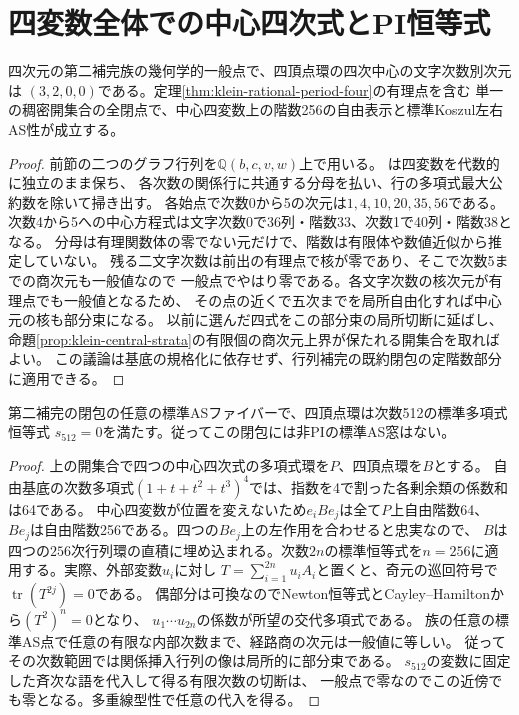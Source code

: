 \section{四変数全体での中心四次式とPI恒等式}
\label{sec:klein-generic-central-parameters}
\begin{theorem}\label{thm:klein-generic-central-parameters}
四次元の第二補完族の幾何学的一般点で、四頂点環の四次中心の文字次数別次元は
$(3,2,0,0)$である。定理\ref{thm:klein-rational-period-four}の有理点を含む
単一の稠密開集合の全閉点で、中心四変数上の階数256の自由表示と標準Koszul左右AS性が成立する。
\end{theorem}
\begin{proof}
前節の二つのグラフ行列を$\mathbb Q(b,c,v,w)$上で用いる。
は四変数を代数的に独立のまま保ち、
各次数の関係行に共通する分母を払い、行の多項式最大公約数を除いて掃き出す。
各始点で次数0から5の次元は$1,4,10,20,35,56$である。
次数4から5への中心方程式は文字次数0で36列・階数33、次数1で40列・階数38となる。
分母は有理関数体の零でない元だけで、階数は有限体や数値近似から推定していない。
残る二文字次数は前出の有理点で核が零であり、そこで次数5までの商次元も一般値なので
一般点でやはり零である。各文字次数の核次元が有理点でも一般値となるため、
その点の近くで五次までを局所自由化すれば中心元の核も部分束になる。
以前に選んだ四式をこの部分束の局所切断に延ばし、
命題\ref{prop:klein-central-strata}の有限個の商次元上界が保たれる開集合を取ればよい。
この議論は基底の規格化に依存せず、行列補完の既約閉包の定階数部分に適用できる。
\end{proof}

\begin{corollary}\label{cor:klein-pi-specializations}
第二補完の閉包の任意の標準ASファイバーで、四頂点環は次数512の標準多項式恒等式
$s_{512}=0$を満たす。従ってこの閉包には非PIの標準AS窓はない。
\end{corollary}
\begin{proof}
上の開集合で四つの中心四次式の多項式環を$P$、四頂点環を$B$とする。
自由基底の次数多項式$(1+t+t^2+t^3)^4$では、指数を4で割った各剰余類の係数和は64である。
中心四変数が位置を変えないため$e_i B e_j$は全て$P$上自由階数64、
$B e_j$は自由階数256である。四つの$B e_j$上の左作用を合わせると忠実なので、
$B$は四つの$256$次行列環の直積に埋め込まれる。次数$2n$の標準恒等式を$n=256$に適用する。実際、外部変数$u_i$に対し
$T=\sum_{i=1}^{2n}u_i A_i$と置くと、奇元の巡回符号で$\operatorname{tr}(T^{2j})=0$である。
偶部分は可換なのでNewton恒等式とCayley--Hamiltonから$(T^2)^n=0$となり、
$u_1\cdots u_{2n}$の係数が所望の交代多項式である。
族の任意の標準AS点で任意の有限な内部次数まで、経路商の次元は一般値に等しい。
従ってその次数範囲では関係挿入行列の像は局所的に部分束である。
$s_{512}$の変数に固定した斉次な語を代入して得る有限次数の切断は、
一般点で零なのでこの近傍でも零となる。多重線型性で任意の代入を得る。
\end{proof}
